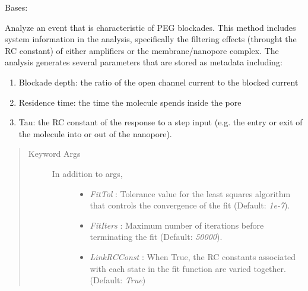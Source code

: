 \documentclass[letterpaper,10pt,english]{sphinxmanual}
\begin{document}
\begin{fulllineitems}
\label{api-doc/mosaic.processing:mosaic.adept2State.adept2State}
Bases: {\hyperref[api\string-doc/mosaic.meta:mosaic.metaEventProcessor.metaEventProcessor]{\emph{}}}

Analyze an event that is characteristic of PEG blockades. This method includes system 
information in the analysis, specifically the filtering effects (throught the RC constant)
of either amplifiers or the membrane/nanopore complex. The analysis generates several 
parameters that are stored as metadata including:
\begin{enumerate}
\item {} 
Blockade depth: the ratio of the open channel current to the blocked current

\item {} 
Residence time: the time the molecule spends inside the pore

\item {} 
Tau: the RC constant of the response to a step input (e.g. the entry or exit of the molecule into or out of the nanopore).

\end{enumerate}
\begin{quote}\begin{description}
\item[{Keyword Args}] \leavevmode\begin{description}
\item[{In addition to {\hyperref[api\string-doc/mosaic.meta:mosaic.metaEventProcessor.metaEventProcessor]{\emph{}}} args,}] \leavevmode\begin{itemize}
\item {} 
\emph{FitTol} :            Tolerance value for the least squares algorithm that controls the convergence of the fit (Default: \emph{1e-7}).

\item {} 
\emph{FitIters} :          Maximum number of iterations before terminating the fit (Default: \emph{50000}).

\item {} 
\emph{LinkRCConst} :       When True, the RC constants associated with each state in the fit function are varied together. (Default: \emph{True})

\end{itemize}


\end{description}
\end{description}
\end{quote}
\end{fulllineitems}
\end{document}
